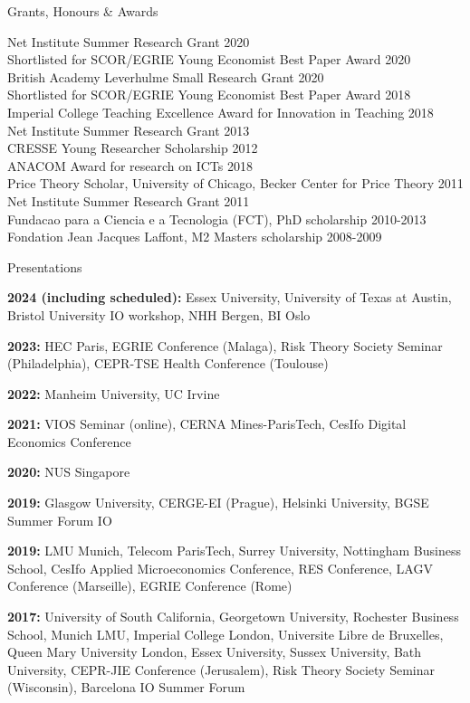 \documentclass{resume}
\begin{document}
\begin{rSection}{Grants, Honours \& Awards}

Net Institute Summer Research Grant \hfill {2020}
\\ Shortlisted for SCOR/EGRIE Young Economist Best Paper Award \hfill 2020
\\ British Academy Leverhulme Small Research Grant \hfill 2020
\\ Shortlisted for SCOR/EGRIE Young Economist Best Paper Award \hfill 2018
\\Imperial College Teaching Excellence Award for Innovation in Teaching \hfill 2018
\\ Net Institute Summer Research Grant \hfill {2013}
\\ CRESSE Young Researcher Scholarship \hfill {2012}
\\ ANACOM Award for research on ICTs \hfill {2018}
\\ Price Theory Scholar, University of Chicago, Becker Center for Price Theory \hfill {2011}
\\ Net Institute Summer Research Grant \hfill {2011}
\\ Fundacao para a Ciencia e a Tecnologia (FCT), PhD scholarship \hfill {2010-2013}
\\ Fondation Jean Jacques Laffont, M2 Masters scholarship \hfill 2008-2009

\end{rSection}



\begin{rSection}{Presentations}

\textbf{2024 (including scheduled):} Essex University, University of Texas at  Austin, Bristol University IO workshop, NHH Bergen, BI Oslo

\textbf{2023:} HEC Paris, EGRIE Conference (Malaga), Risk Theory Society Seminar (Philadelphia), CEPR-TSE Health Conference (Toulouse)

\textbf{2022:} Manheim University, UC Irvine

\textbf{2021:} VIOS Seminar (online), CERNA Mines-ParisTech, CesIfo Digital Economics Conference

\textbf{2020:} NUS Singapore

\textbf{2019:} Glasgow University, CERGE-EI (Prague), Helsinki University, BGSE Summer Forum IO

\textbf{2019:} LMU Munich, Telecom ParisTech, Surrey University, Nottingham Business School, CesIfo Applied Microeconomics Conference, RES Conference, LAGV Conference (Marseille), EGRIE Conference (Rome)

\textbf{2017:} University of South California, Georgetown University, Rochester Business School, Munich LMU, Imperial College London, Universite Libre de Bruxelles, Queen Mary University London, Essex University, Sussex University, Bath University, CEPR-JIE Conference (Jerusalem), Risk Theory Society Seminar (Wisconsin), Barcelona IO Summer Forum 

\end{rSection}
\end{document}
